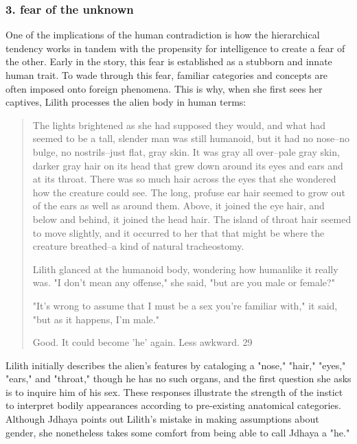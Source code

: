 \documentclass[11pt]{article}
\begin{document}
\subsubsection{3. fear of the unknown}
\label{sec:org0991e26}
One of the implications of the human contradiction is how the
hierarchical tendency works in tandem with the propensity for
intelligence to create a fear of the other. Early in the story, this
fear is established as a stubborn and innate human trait. To wade
through this fear, familiar categories and concepts are often imposed
onto foreign phenomena. This is why, when she first sees her captives,
Lilith processes the alien body in human terms:
\begin{quote}
The lights brightened as she had supposed they would, and what had
seemed to be a tall, slender man was still humanoid, but it had no
nose--no bulge, no nostrils--just flat, gray skin. It was gray all
over--pale gray skin, darker gray hair on its head that grew down
around its eyes and ears and at its throat. There was so much hair
across the eyes that she wondered how the creature could see. The
long, profuse ear hair seemed to grow out of the ears as well as
around them. Above, it joined the eye hair, and below and behind, it
joined the head hair. The island of throat hair seemed to move
slightly, and it occurred to her that that might be where the creature
breathed--a kind of natural tracheostomy.

Lilith glanced at the humanoid body, wondering how humanlike it really
was. "I don't mean any offense," she said, "but are you male or
female?"

"It's wrong to assume that I must be a sex you're familiar with," it
said, "but as it happens, I'm male."

Good. It could become 'he' again. Less awkward. 29
\end{quote}
Lilith initially describes the alien's features by cataloging a
"nose," "hair," "eyes," "ears," and "throat," though he has no such
organs, and the first question she asks is to inquire him of his
sex. These responses illustrate the strength of the instict to
interpret bodily appearances according to pre-existing anatomical
categories. Although Jdhaya points out Lilith's mistake in making
assumptions about gender, she nonetheless takes some comfort from
being able to call Jdhaya a "he."
\end{document}
